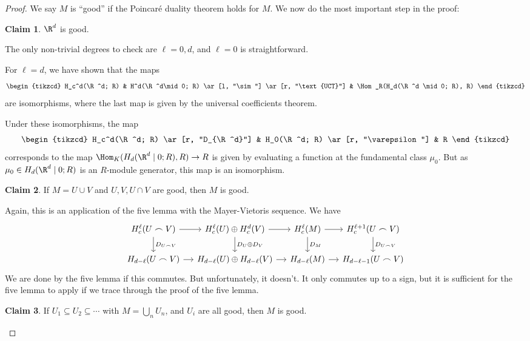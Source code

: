 \documentclass[a4paper]{article}
\begin{document}
\theoremstyle{definition}
\newtheorem{cclaim}{Claim}
\setcounter{cclaim}{-1}
\begin{proof}
  We say $M$ is ``good'' if the Poincar\'e duality theorem holds for $M$. We now do the most important step in the proof:
  \begin{cclaim}
    $\R^d$ is good.
  \end{cclaim}
  The only non-trivial degrees to check are $\ell = 0, d$, and $\ell = 0$ is straightforward.

  For $\ell =d $, we have shown that the maps
  \[
    \begin{tikzcd}
      H_c^d(\R^d; R) & H^d(\R^d\mid 0; R) \ar[l, "\sim"] \ar[r, "\text{UCT}"] & \Hom_R(H_d(\R^d \mid 0; R), R)
    \end{tikzcd}
  \]
  are isomorphisms, where the last map is given by the universal coefficients theorem.

  Under these isomorphisms, the map
  \[
    \begin{tikzcd}
      H_c^d(\R^d; R) \ar[r, "D_{\R^d}"] & H_0(\R^d; R) \ar[r, "\varepsilon"] & R
    \end{tikzcd}
  \]
  corresponds to the map $\Hom_K(H_d(\R^d \mid 0; R), R) \to R$ is given by evaluating a function at the fundamental class $\mu_0$. But as $\mu_0 \in H_d(\R^d \mid 0; R)$ is an $R$-module generator, this map is an isomorphism.

  \begin{cclaim}
    If $M = U \cup V$ and $U, V, U \cap V$ are good, then $M$ is good.
  \end{cclaim}
  Again, this is an application of the five lemma with the Mayer-Vietoris sequence. We have
  \[
    \begin{tikzcd}[column sep=small]
      H_c^\ell (U \frown V) \ar[r] \ar[d, "D_{U \frown V}"] & H_c^\ell(U) \oplus H_c^d(V) \ar[r] \ar[d, "D_U \oplus D_V"] & H_c^\ell(M) \ar[r] \ar[d, "D_M"] & H_c^{\ell + 1}(U \frown V) \ar[d, "D_{U\frown V}"]\\
      H_{d - \ell}(U \frown V) \ar[r] & H_{d - \ell}(U) \oplus H_{d - \ell}(V) \ar[r] & H_{d - \ell}(M) \ar[r] & H_{d - \ell - 1}(U \frown V)
    \end{tikzcd}
  \]
  We are done by the five lemma if this commutes. But unfortunately, it doesn't. It only commutes up to a sign, but it is sufficient for the five lemma to apply if we trace through the proof of the five lemma.

  \begin{cclaim}
    If $U_1 \subseteq U_2 \subseteq \cdots$ with $M = \bigcup_n U_n$, and $U_i$ are all good, then $M$ is good.
  \end{cclaim}


\end{proof}
\end{document}
